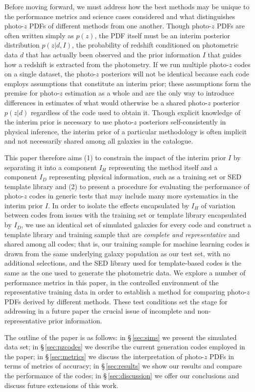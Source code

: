 Before moving forward, we must address how the best methods may be unique to the performance metrics and science cases considered and what distinguishes photo-$z$ PDFs of different methods from one another.
Though photo-$z$ PDFs are often written simply as $p(z)$, the PDF itself must be an interim posterior distribution $p(z | d, I)$, the probability of redshift conditioned on photometric data $d$ that has actually been observed and the prior information $I$ that guides how a redshift is extracted from the photometry.
If we run multiple photo-$z$ codes on a single dataset, the photo-$z$  posteriors will not be identical because each code employs assumptions that constitute an interim prior; these assumptions form the premise for photo-$z$ estimation as a whole and are the only way to introduce differences in estimates of what would otherwise be a shared photo-$z$ posterior $p(z | d)$ regardless of the code used to obtain it.
Though explicit knowledge of the interim prior is necessary to use photo-$z$ posteriors self-consistently in physical inference, the interim prior of a particular methodology is often implicit and not necessarily shared among all galaxies in the catalogue.

This paper therefore aims (1) to constrain the impact of the interim prior $I$ by separating it into a component $I_{H}$ representing the method itself and a component $I_{D}$ representing physical information, such as a training set or SED template library and (2) to present a procedure for evaluating the performance of photo-$z$ codes in generic tests that may include many more systematics in the interim prior $I$.
In order to isolate the effects encapsulated by $I_{H}$ of variation between codes from issues with the training set or template library encapsulated by $I_{D}$, we use an identical set of simulated galaxies for every code and construct a template library and training sample that are {\it complete and representative} and shared among all codes; that is, our training sample for machine learning codes is drawn from the same underlying galaxy population as our test set, with no additional selections, and the SED library used for template-based codes is the same as the one used to generate the photometric data.
We explore a number of performance metrics in this paper, in the controlled environment of the representative training data in order to establish a method for comparing photo-$z$ PDFs derived by different methods.
These test conditions set the stage for addressing in a future paper the crucial issue of incomplete and non-representative prior information.

The outline of the paper is as follows: in \S\,\ref{sec:sims} we present the simulated data set; in \S\,\ref{sec:pzcodes} we describe the current generation codes employed in the paper;  in \S\,\ref{sec:metrics} we discuss the interpretation of photo-$z$ PDFs in terms of metrics of accuracy; in \S\,\ref{sec:results} we show our results and compare the performance of the codes; in \S\,\ref{sec:discussion} we offer our conclusions and discuss future extensions of this work.
